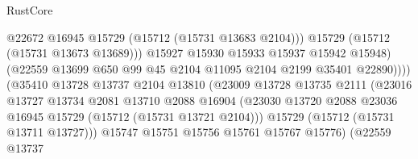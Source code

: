 \begin{lexlean}{RustCore}
\begin{coremodule}
                                            @22672
                                            @16945
                                            @15729
                                            (@15712 (@15731 @13683 @2104)))
                                          @15729
                                          (@15712 (@15731 @13673 @13689)))
                                        @15927
                                        @15930
                                        @15933
                                        @15937
                                        @15942
                                        @15948)
                                      (@22559
                                        @13699
                                        @650
                                        @99
                                        @45
                                        @2104
                                        @11095
                                        @2104
                                        @2199
                                        @35401
                                        @22890))))
                                (@35410
                                  @13728
                                  @13737
                                  @2104
                                  @13810
                                  (@23009
                                    @13728
                                    @13735
                                    @2111
                                    (@23016
                                      @13727
                                      @13734
                                      @2081
                                      @13710
                                      @2088
                                      @16904
                                      (@23030
                                        @13720
                                        @2088
                                        @23036
                                        @16945
                                        @15729
                                        (@15712 (@15731 @13721 @2104)))
                                      @15729
                                      (@15712 (@15731 @13711 @13727)))
                                    @15747
                                    @15751
                                    @15756
                                    @15761
                                    @15767
                                    @15776)
                                  (@22559
                                    @13737

\end{coremodule}
\end{lexlean}
